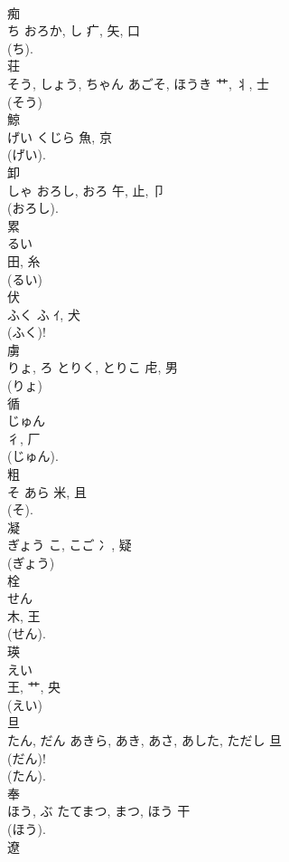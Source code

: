 \documentclass[8pt]{extreport}
\begin{document}
\begin{CJK}{UTF8}{min}
\\	痴	
\\	ち	おろか, し	疒, 矢, 口	
\\	(ち). 
\\	荘	
\\	そう, しょう, ちゃん	あごそ, ほうき	艹, 丬, 士	
\\	(そう) 
\\	鯨	
\\	げい	くじら	魚, 京	
\\	(げい). 
\\	卸	
\\	しゃ	おろし, おろ	午, 止, 卩	
\\	(おろし). 
\\	累	
\\	るい	
\\	田, 糸	
\\	(るい) 
\\	伏	
\\	ふく	ふ	ｲ, 犬	
\\	(ふく)!
\\	虜	
\\	りょ, ろ	とりく, とりこ	虍, 男	
\\	(りょ) 
\\	循	
\\	じゅん	
\\	彳, 厂		
\\	(じゅん). 
\\	粗	
\\	そ	あら	米, 且	
\\	(そ).	
\\	凝	
\\	ぎょう	こ, こご	冫, 疑	
\\	(ぎょう) 
\\	栓	
\\	せん	
\\	木, 王		
\\	(せん). 
\\	瑛	
\\	えい	
\\	王, 艹, 央	
\\	(えい) 
\\	旦	
\\	たん, だん	あきら, あき, あさ, あした, ただし	旦	
\\	(だん)! 
\\	(たん). 
\\	奉	
\\	ほう, ぶ	たてまつ, まつ, ほう	干		
\\	(ほう). 
\\	遼	

\end{CJK}
\end{document}
